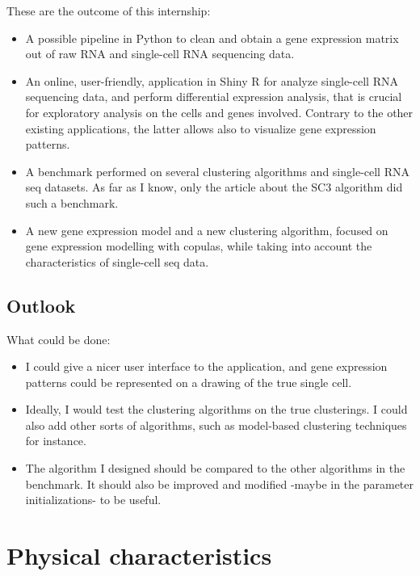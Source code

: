 \documentclass{report}
\begin{document}
These are the outcome of this internship:
\begin{itemize}
\item A possible pipeline in Python to clean and obtain a gene expression matrix out of raw RNA and single-cell RNA sequencing data.
\item An online, user-friendly, application in Shiny R for analyze single-cell RNA sequencing data, and perform differential expression analysis, that is crucial for exploratory analysis on the cells and genes involved. Contrary to the other existing applications, the latter allows also to visualize gene expression patterns.
\item A benchmark performed on several clustering algorithms and single-cell RNA seq datasets. As far as I know, only the article about the SC3 algorithm\cite{kiselev2016sc3} did such a benchmark.
\item A new gene expression model and a new clustering algorithm, focused on gene expression modelling with copulas, while taking into account the characteristics of single-cell seq data.
\end{itemize}

\section{Outlook}

What could be done:
\begin{itemize}
\item I could give a nicer user interface to the application, and gene expression patterns could be represented on a drawing of the true single cell.
\item Ideally, I would test the clustering algorithms on the true clusterings. I could also add other sorts of algorithms, such as model-based clustering techniques for instance.
\item The algorithm I designed should be compared to the other algorithms in the benchmark. It should also be improved and modified -maybe in the parameter initializations- to be useful.
\end{itemize}

\newpage




\newpage

\appendix

\chapter*{Physical characteristics}
\end{document}
